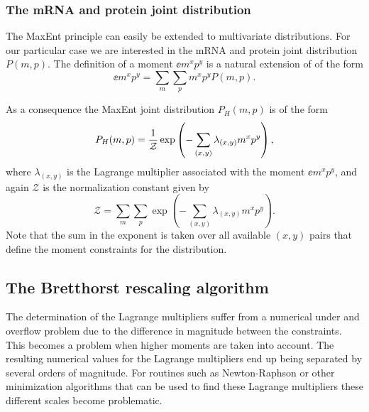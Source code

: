 \subsubsection{The mRNA and protein joint distribution}

The MaxEnt principle can easily be extended to multivariate distributions. For
our particular case we are interested in the mRNA and protein joint distribution
$P(m, p)$. The definition of a moment $\ee{m^x p^y}$ is a natural extension of
 of the form
\begin{equation}
  \ee{m^x p^y} = \sum_m \sum_p m^x p^y P(m, p).
\end{equation}

As a consequence the MaxEnt joint distribution $P_H(m, p)$ is of the form
\begin{equation}
  P_H(m, p) = {1 \over \mathcal{Z}}
              \exp \left( - \sum_{(x,y)} \lambda_{(x,y)} m^x p^y \right),
  \label{seq_maxEnt_joint}
\end{equation}
where $\lambda_{(x,y)}$ is the Lagrange multiplier associated with the moment
$\ee{m^x p^y}$, and again $\mathcal{Z}$ is the normalization constant given by
\begin{equation}
  \mathcal{Z} = \sum_m \sum_p
              \exp \left( - \sum_{(x, y)} \lambda_{(x, y)} m^x p^y \right).
\end{equation}
Note that the sum in the exponent is taken over all available $(x, y)$ pairs
that define the moment constraints for the distribution.

\subsection{The Bretthorst rescaling algorithm}

The determination of the Lagrange multipliers suffer from a numerical under and
overflow problem due to the difference in magnitude between the constraints.
This becomes a problem when higher moments are taken into account. The resulting
numerical values for the Lagrange multipliers end up being separated by several
orders of magnitude. For routines such as Newton-Raphson or other minimization
algorithms that can be used to find these Lagrange multipliers these different
scales become problematic.


